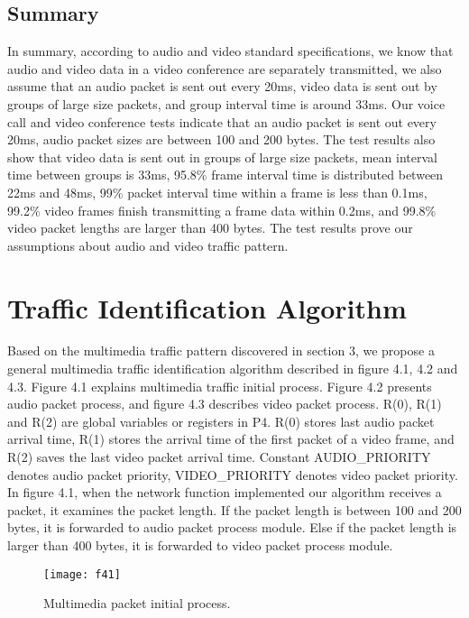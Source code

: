 \documentclass[master]{thesis}
\begin{document}
\section{Summary}

In summary, according to audio and video standard specifications, we know that audio and video data in a video conference are separately transmitted, we also assume that an audio packet is sent out every 20ms, video data is sent out by groups of large size packets, and group interval time is around 33ms.  Our voice call and video conference tests indicate that an audio packet is sent out every 20ms, audio packet sizes are between 100 and 200 bytes. The test results also show that video data is sent out in groups of large size packets, mean interval time between groups is 33ms, 95.8\% frame interval time is distributed between 22ms and 48ms, 99\% packet interval time within a frame is less than 0.1ms, 99.2\% video frames finish transmitting a frame data within 0.2ms, and 99.8\% video packet lengths are larger than 400 bytes. The test results prove our assumptions about audio and video traffic pattern. 

\chapter{Traffic Identification Algorithm}
\label{chap:traffic.identification.algorithm}

Based on the multimedia traffic pattern discovered in section 3, we propose a general multimedia traffic identification algorithm described in figure 4.1, 4.2 and 4.3. Figure 4.1 explains multimedia traffic initial process. Figure 4.2 presents audio packet process, and figure 4.3 describes video packet process. R(0), R(1) and R(2) are global variables or registers in P4. R(0) stores last audio packet arrival time, R(1) stores the arrival time of the first packet of a video frame, and R(2) saves the last video packet arrival time. Constant AUDIO\_PRIORITY denotes audio packet priority, VIDEO\_PRIORITY denotes video packet priority. In figure 4.1, when the network function implemented our algorithm receives a packet, it examines the packet length. If the packet length is between 100 and 200 bytes, it is forwarded to audio packet process module. Else if the packet length is larger than 400 bytes, it is forwarded to video packet process module. 

\begin{figure}[htp]
    \texttt{[image: f41]}
    \caption[Multimedia packet initial process.]{Multimedia packet initial process.}
    \label{fig:f41}
\end{figure}
\end{document}
